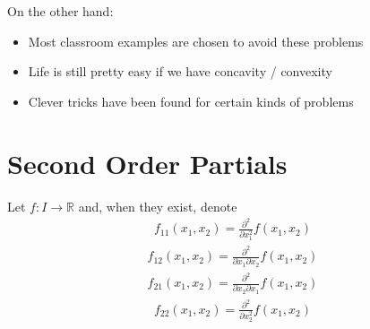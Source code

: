 \documentclass[letterpaper,10pt,english]{jupyterBook}
\begin{document}
\sphinxAtStartPar
On the other hand:
\begin{itemize}
\item {} 
\sphinxAtStartPar
Most classroom examples are chosen to avoid these problems

\item {} 
\sphinxAtStartPar
Life is still pretty easy if we have concavity / convexity

\item {} 
\sphinxAtStartPar
Clever tricks have been found for certain kinds of problems

\end{itemize}


\section{Second Order Partials}
\label{\detokenize{02.optimization_intro:second-order-partials}}
\sphinxAtStartPar
Let \(f \colon I \to \mathbb{R}\) and, when they exist, denote
\begin{equation*}
\begin{split}
f_{11}(x_1, x_2) 
= \frac{\partial^2}{\partial x_1^2} 
f(x_1, x_2)
\end{split}
\end{equation*}\begin{equation*}
\begin{split}
f_{12}(x_1, x_2) 
= \frac{\partial^2}{\partial x_1 \partial x_2} 
f(x_1, x_2)
\end{split}
\end{equation*}\begin{equation*}
\begin{split}
f_{21}(x_1, x_2) 
= \frac{\partial^2}{\partial x_2 \partial x_1} 
f(x_1, x_2)
\end{split}
\end{equation*}\begin{equation*}
\begin{split}
f_{22}(x_1, x_2) 
= \frac{\partial^2}{\partial x_2^2} 
f(x_1, x_2)
\end{split}
\end{equation*}
\end{document}
